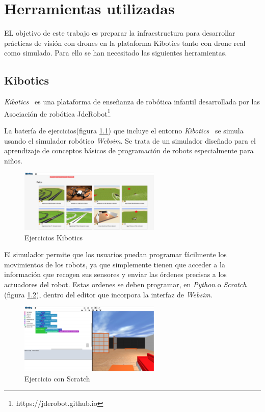 \chapter{Herramientas utilizadas}\label{cap.herramientas}
EL objetivo de este trabajo es preparar la infraestructura para desarrollar prácticas de visión con drones en la plataforma Kibotics\cite{kibotics} tanto con drone real como simulado. Para ello se han necesitado las siguientes herramientas.

\section{Kibotics}
\textit{Kibotics}~\cite{kibotics} es una plataforma de enseñanza de robótica infantil desarrollada por las Asociación de robótica JdeRobot\footnote{https://jderobot.github.io}

La batería de ejercicios(figura \ref{fig:kibotics2}) que incluye el entorno \textit{Kibotics}~\cite{kibotics} se simula usando el simulador robótico \textit{Websim}. Se trata de un simulador diseñado para el aprendizaje de conceptos básicos de programación de robots especialmente para niños. 
\begin{figure}[H]
  \begin{center}
    \includegraphics[width=0.6\textwidth]{figures/herramientas/kibotics2.png}
		\caption{Ejercicios Kibotics}
		\label{fig:kibotics2}
		\end{center}
\end{figure}

El simulador permite que los usuarios puedan programar fácilmente los movimientos de los robots, ya que simplemente tienen que acceder a la información que recogen sus sensores y enviar las órdenes precisas a los actuadores del robot. Estas ordenes se deben programar, en \textit{Python} o \textit{Scratch} (figura \ref{fig:kibotics1}), dentro del editor que incorpora la interfaz de \textit{Websim}.
\begin{figure}[H]
  \begin{center}
    \includegraphics[width=0.6\textwidth]{figures/herramientas/kibotics1.png}
		\caption{Ejercicio con Scratch}
		\label{fig:kibotics1}
		\end{center}
\end{figure}

